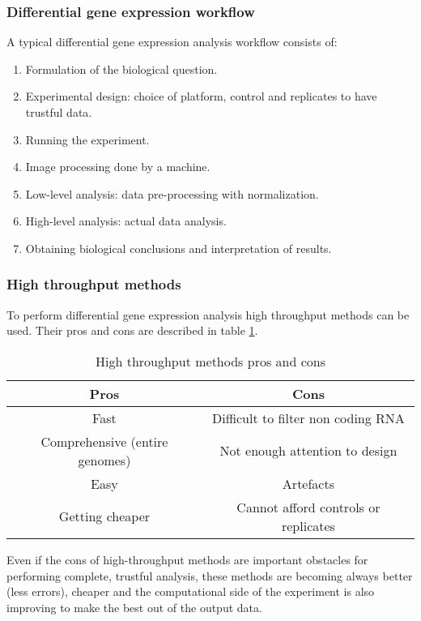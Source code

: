 		\subsubsection{Differential gene expression workflow}
		A typical differential gene expression analysis workflow consists of:

		\begin{multicols}{2}
			\begin{enumerate}
				\item Formulation of the biological question.
				\item Experimental design: choice of platform, control and replicates to have trustful data.
				\item Running the experiment.
				\item Image processing done by a machine.
				\item Low-level analysis: data pre-processing with normalization.
				\item High-level analysis: actual data analysis.
				\item Obtaining biological conclusions and interpretation of results.
			\end{enumerate}
		\end{multicols}

		\subsubsection{High throughput methods}
		To perform differential gene expression analysis high throughput methods can be used.
		Their pros and cons are described in table \ref{tab:high-through-dge}.

		\begin{table}[H]
			\centering
			\begin{tabular}{|c|c|}
				\hline
				Pros & Cons\\
				\hline
				Fast & Difficult to filter non coding RNA\\
				Comprehensive (entire genomes) & Not enough attention to design\\
				Easy & Artefacts\\
				Getting cheaper & Cannot afford controls or replicates\\
				\hline
			\end{tabular}
			\caption{High throughput methods pros and cons}
			\label{tab:high-through-dge}
		\end{table}
		
		Even if the cons of high-throughput methods are important obstacles for performing complete, trustful analysis, these methods are becoming always better (less errors), cheaper and the computational side of the experiment is also improving to make the best out of the output data.
		
